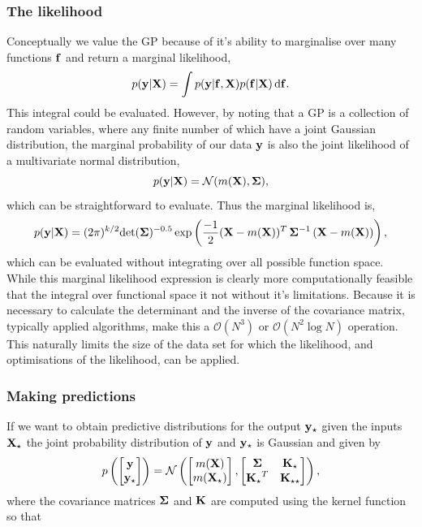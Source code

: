 \subsubsection{The likelihood}
Conceptually we value the GP because of it's ability to marginalise over many functions $\bf f$ and return a marginal likelihood,
\begin{equation}
p({\bf y} | {\bf X}) = \int p({\bf y} | {\bf f}, {\bf X}) p({\bf f} | {\bf X}) \, {\rm d}{\bf f}.
\end{equation}
This integral could be evaluated.  However, by noting that a GP is a collection of random variables, where any finite number of which have a joint Gaussian distribution, the marginal probability of our data $\bf y$ is also the joint likelihood of a multivariate normal distribution,
\begin{equation}
p({\bf y} | {\bf X}) = \mathcal{N}(m({\bf X}), {\bf \Sigma}),
\end{equation}
which can be straightforward to evaluate.  Thus the marginal likelihood is,
\begin{equation}
p({\bf y} | {\bf X}) = (2 \pi)^{k/2} {\rm det} ({\bf \Sigma})^{-0.5} \exp \left(\frac{-1}{2} ({\bf X} - m({\bf X}))^{T} \, {\bf \Sigma}^{-1} \, ({\bf X} - m({\bf X})) \right),
\end{equation}
which can be evaluated without integrating over all possible function space.   While this marginal likelihood expression is clearly more computationally feasible that the integral over functional space it not without it's limitations.  Because it is necessary to calculate the determinant and the inverse of the covariance matrix, typically applied algorithms,  make this a $\mathcal{O}(N^3)$ or $\mathcal{O}(N^2 \log N)$ operation.  This naturally limits the size of the data set for which the likelihood,  and optimisations of the likelihood, can be applied.  

\subsubsection{Making predictions}
If we want to obtain predictive distributions for the output $\bf y_{\star}$ given the inputs $\bf X_{\star}$ the joint probability distribution of $\bf y$ and $\bf y_{\star}$ is Gaussian and given by
\begin{equation}
p \left( \begin{bmatrix} {\bf y} \\ {\bf y_{\star}} \end{bmatrix} \right) = \mathcal{N} \left( \begin{bmatrix} m({\bf X}) \\ m({\bf X_{\star}}) \end{bmatrix} , \begin{bmatrix} {\bf \Sigma} & {\bf K_{\star} }\\ {\bf K_{\star}}^{T} & {\bf K_{\star \star}} \end{bmatrix}  \right), 
\end{equation}
where the covariance matrices $\bf \Sigma$ and $\bf K$ are computed using the kernel function so that

